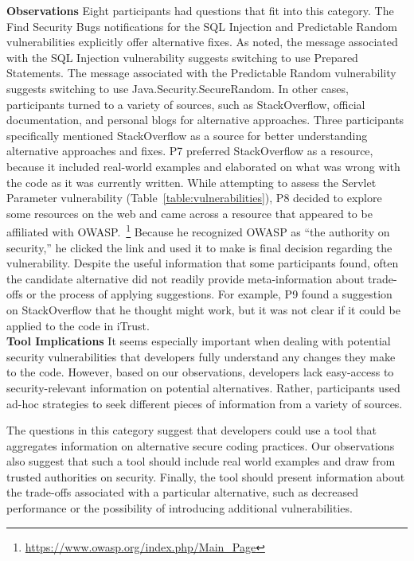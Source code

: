 \documentclass[conference]{IEEEtran}
\begin{document}
\noindent\textbf{Observations}
Eight participants had questions that fit into this category. 
The Find Security Bugs notifications for the SQL Injection and Predictable Random vulnerabilities explicitly offer alternative fixes. 
As noted, the message associated with the SQL Injection vulnerability suggests switching to use Prepared Statements. 
The message associated with the Predictable Random vulnerability suggests switching to use Java.Security.SecureRandom. 
In other cases, participants turned to a variety of sources, such as StackOverflow, official documentation, and personal blogs for alternative approaches. 
Three participants specifically mentioned StackOverflow as a source for better understanding alternative approaches and fixes. 
P7 preferred StackOverflow as a resource, because it included real-world examples and elaborated on what was wrong with the code as it was currently written.  
While attempting to assess the Servlet Parameter vulnerability (Table~\ref{table:vulnerabilities}), P8 decided to explore some resources on the web and came across a resource that appeared to be affiliated with OWASP.~\footnote{\url{https://www.owasp.org/index.php/Main_Page}} 
Because he recognized OWASP as ``the authority on security,'' he clicked the link and used it to make is final decision regarding the vulnerability. 
Despite the useful information that some participants found, often the candidate alternative did not readily provide meta-information about trade-offs or the process of applying suggestions. 
For example, P9 found a suggestion on StackOverflow that he thought might work, but it was not clear if it could be applied to the code in iTrust. 
\\

\noindent\textbf{Tool Implications} 
It seems especially important when dealing with potential security vulnerabilities that developers fully understand any changes they make to the code. 
However, based on our observations, developers lack easy-access to security-relevant information on potential alternatives. 
Rather, participants used ad-hoc strategies to seek different pieces of information from a variety of sources. 

The questions in this category suggest that developers could use a tool that aggregates information on alternative secure coding practices.
Our observations also suggest that such a tool should include real world examples and draw from trusted authorities on security.
Finally, the tool should present information about the trade-offs associated with a particular alternative, such as decreased performance or the possibility of introducing additional vulnerabilities. 
\end{document}
